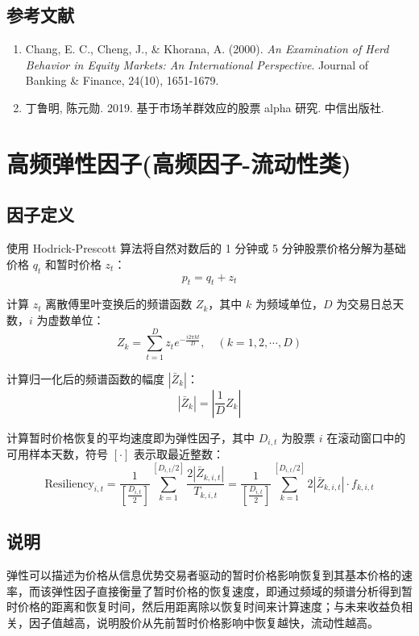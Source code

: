 \documentclass{article}
\begin{document}
\subsection{参考文献}
\begin{enumerate}
    \item Chang, E. C., Cheng, J., \& Khorana, A. (2000). \textit{An Examination of Herd Behavior in Equity Markets: An International Perspective}. Journal of Banking \& Finance, 24(10), 1651-1679.
    \item 丁鲁明, 陈元勋. 2019. 基于市场羊群效应的股票 alpha 研究. 中信出版社.
\end{enumerate}

\section{高频弹性因子(高频因子-流动性类)}

\subsection{因子定义}
使用 Hodrick-Prescott 算法将自然对数后的 1 分钟或 5 分钟股票价格分解为基础价格 \( q_t \) 和暂时价格 \( z_t \)：
\begin{equation}
    p_t = q_t + z_t
\end{equation}

计算 \( z_t \) 离散傅里叶变换后的频谱函数 \( Z_k \)，其中 \( k \) 为频域单位，\( D \) 为交易日总天数，\( i \) 为虚数单位：
\begin{equation}
    Z_k = \sum_{t=1}^{D} z_t e^{-\frac{i2\pi kt}{D}}, \quad (k = 1, 2, \cdots, D)
\end{equation}

计算归一化后的频谱函数的幅度 \( |\bar{Z}_k| \)：
\begin{equation}
    |\bar{Z}_k| = \left| \frac{1}{D} Z_k \right|
\end{equation}

计算暂时价格恢复的平均速度即为弹性因子，其中 \( D_{i,t} \) 为股票 \( i \) 在滚动窗口中的可用样本天数，符号 \([\cdot]\) 表示取最近整数：
\begin{equation}
    \mathrm{Resiliency}_{i,t} = \frac{1}{\left[ \frac{D_{i,t}}{2} \right]} \sum_{k=1}^{\left[ D_{i,t}/2 \right]} \frac{2|\bar{Z}_{k,i,t}|}{T_{k,i,t}} = \frac{1}{\left[ \frac{D_{i,t}}{2} \right]} \sum_{k=1}^{\left[ D_{i,t}/2 \right]} 2|\bar{Z}_{k,i,t}| \cdot f_{k,i,t}
\end{equation}

\subsection{说明}
弹性可以描述为价格从信息优势交易者驱动的暂时价格影响恢复到其基本价格的速率，而该弹性因子直接衡量了暂时价格的恢复速度，即通过频域的频谱分析得到暂时价格的距离和恢复时间，然后用距离除以恢复时间来计算速度；与未来收益负相关，因子值越高，说明股价从先前暂时价格影响中恢复越快，流动性越高。
\end{document}
